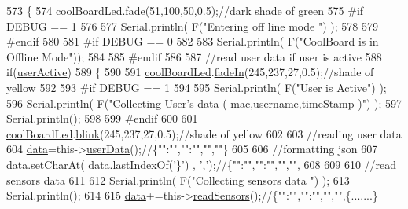 \begin{DoxyCode}
573 \{
574     \hyperlink{class_cool_board_a1b1d3c684a5baa56b08486e192fd8e97}{coolBoardLed}.\hyperlink{class_cool_board_led_af1cacbaa88db8bcf6042c1083ba41155}{fade}(51,100,50,0.5);\textcolor{comment}{//dark shade of green  }
575 \textcolor{preprocessor}{#if DEBUG == 1  }
576     
577     Serial.println( F(\textcolor{stringliteral}{"Entering off line mode "}) ); 
578     
579 \textcolor{preprocessor}{#endif}
580 
581 \textcolor{preprocessor}{#if DEBUG == 0}
582 
583     Serial.println( F(\textcolor{stringliteral}{"CoolBoard is in Offline Mode"}));
584 
585 \textcolor{preprocessor}{#endif}
586 
587     \textcolor{comment}{//read user data if user is active}
588     \textcolor{keywordflow}{if}(\hyperlink{class_cool_board_a6395459131d6889a3005f79c7a35e964}{userActive})
589     \{
590 
591         \hyperlink{class_cool_board_a1b1d3c684a5baa56b08486e192fd8e97}{coolBoardLed}.\hyperlink{class_cool_board_led_ab778f5e7bed0ab74e3906d82110493c3}{fadeIn}(245,237,27,0.5);\textcolor{comment}{//shade of yellow}
592 
593 \textcolor{preprocessor}{    #if DEBUG == 1}
594         
595         Serial.println( F(\textcolor{stringliteral}{"User is Active"}) );
596         Serial.println( F(\textcolor{stringliteral}{"Collecting User's data ( mac,username,timeStamp )"}) );
597         Serial.println();
598 
599 \textcolor{preprocessor}{    #endif}
600 
601         \hyperlink{class_cool_board_a1b1d3c684a5baa56b08486e192fd8e97}{coolBoardLed}.\hyperlink{class_cool_board_led_a96e1ea13003eee34c9dbcef340404426}{blink}(245,237,27,0.5);\textcolor{comment}{//shade of yellow   }
602 
603         \textcolor{comment}{//reading user data}
604         \hyperlink{class_cool_board_a427fb753dd8575bdf821c70a5c63d695}{data}=this->\hyperlink{class_cool_board_ae7358fb6e623cfc81b775f5f1734909b}{userData}();\textcolor{comment}{//\{"":"","":"","",""\}}
605 
606         \textcolor{comment}{//formatting json }
607         \hyperlink{class_cool_board_a427fb753dd8575bdf821c70a5c63d695}{data}.setCharAt( \hyperlink{class_cool_board_a427fb753dd8575bdf821c70a5c63d695}{data}.lastIndexOf(\textcolor{charliteral}{'\}'}) , \textcolor{charliteral}{','});\textcolor{comment}{//\{"":"","":"","","",}
608         
609                 
610         \textcolor{comment}{//read sensors data}
611 
612         Serial.println( F(\textcolor{stringliteral}{"Collecting sensors data "}) );
613         Serial.println();
614 
615         \hyperlink{class_cool_board_a427fb753dd8575bdf821c70a5c63d695}{data}+=this->\hyperlink{class_cool_board_ad03abdce2e65f520bbf2cff0f2d083cf}{readSensors}();\textcolor{comment}{//\{"":"","":"","","",\{.......\}}

\end{DoxyCode}

